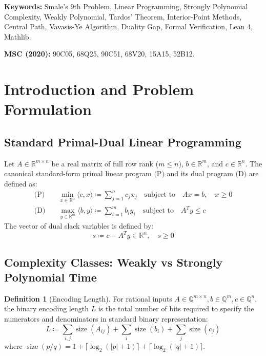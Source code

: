 \documentclass[11pt,a4paper]{article}
\theoremstyle{definition}
\newtheorem{definition}[theorem]{Definition}
\begin{document}
\vspace{0.5em}
\noindent\textbf{Keywords:} Smale's 9th Problem, Linear Programming, Strongly Polynomial Complexity, Weakly Polynomial, Tardos' Theorem, Interior-Point Methods, Central Path, Vavasis-Ye Algorithm, Duality Gap, Formal Verification, Lean 4, Mathlib.

\noindent\textbf{MSC (2020):} 90C05, 68Q25, 90C51, 68V20, 15A15, 52B12.

\tableofcontents
\newpage

\section{Introduction and Problem Formulation}

\subsection{Standard Primal-Dual Linear Programming}
Let $A \in \mathbb{R}^{m \times n}$ be a real matrix of full row rank ($m \le n$), $b \in \mathbb{R}^m$, and $c \in \mathbb{R}^n$. The canonical standard-form primal linear program $\text{(P)}$ and its dual program $\text{(D)}$ are defined as:
\begin{align}
\text{(P)} \quad & \min_{x \in \mathbb{R}^n} \langle c, x \rangle \coloneqq \sum_{j=1}^n c_j x_j \quad \text{subject to} \quad A x = b, \quad x \ge 0 \label{eq:primal_lp} \\
\text{(D)} \quad & \max_{y \in \mathbb{R}^m} \langle b, y \rangle \coloneqq \sum_{i=1}^m b_i y_i \quad \text{subject to} \quad A^T y \le c \label{eq:dual_lp}
\end{align}
The vector of dual slack variables is defined by:
\begin{equation}\label{eq:slack_def}
s \coloneqq c - A^T y \in \mathbb{R}^n, \quad s \ge 0
\end{equation}

\subsection{Complexity Classes: Weakly vs Strongly Polynomial Time}

\begin{definition}[Encoding Length]\label{def:bit_length}
For rational inputs $A \in \mathbb{Q}^{m \times n}, b \in \mathbb{Q}^m, c \in \mathbb{Q}^n$, the binary encoding length $L$ is the total number of bits required to specify the numerators and denominators in standard binary representation:
\begin{equation}\label{eq:bit_length}
L \coloneqq \sum_{i,j} \operatorname{size}(A_{ij}) + \sum_{i} \operatorname{size}(b_i) + \sum_{j} \operatorname{size}(c_j)
\end{equation}
where $\operatorname{size}(p/q) = 1 + \lceil \log_2(|p|+1) \rceil + \lceil \log_2(|q|+1) \rceil$.
\end{definition}
\end{document}
